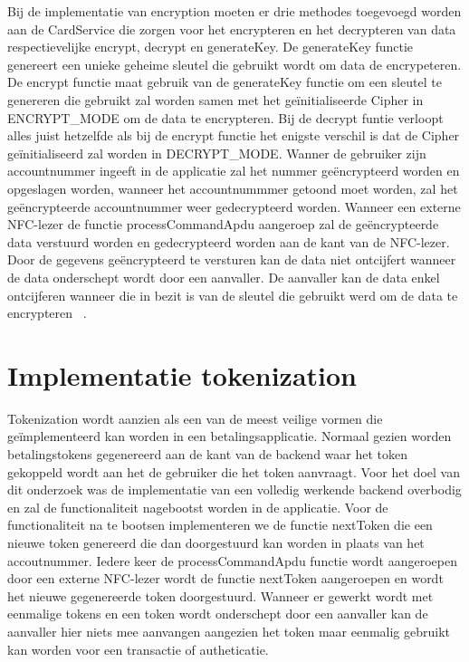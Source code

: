 Bij de implementatie van encryption moeten er drie methodes toegevoegd worden aan de CardService die zorgen voor het encrypteren en het decrypteren van data respectievelijke encrypt, decrypt en generateKey. De generateKey functie genereert een unieke geheime sleutel die gebruikt wordt om data de encrypeteren. De encrypt functie maat gebruik van de generateKey functie om een sleutel te genereren die gebruikt zal worden samen met het geïnitialiseerde Cipher in ENCRYPT\_MODE om de data te encrypteren. Bij de decrypt funtie verloopt alles juist hetzelfde als bij de encrypt functie het enigste verschil is dat de Cipher geïnitialiseerd zal worden in DECRYPT\_MODE. Wanner de gebruiker zijn accountnummer ingeeft in de applicatie zal het nummer geëncrypteerd worden en opgeslagen worden, wanneer het accountnummmer getoond moet worden, zal het geëncrypteerde accountnummer weer gedecrypteerd worden. Wanneer een externe NFC-lezer de functie processCommandApdu aangeroep zal de geëncrypteerde data verstuurd worden en gedecrypteerd worden aan de kant van de NFC-lezer. Door de gegevens geëncrypteerd te versturen kan de data niet ontcijfert wanneer de data onderschept wordt door een aanvaller. De aanvaller kan de data enkel ontcijferen wanneer die in bezit is van de sleutel die gebruikt werd om de data te encrypteren ~\autocite{HowToEncrypt}. 

\section{Implementatie tokenization}

Tokenization wordt aanzien als een van de meest veilige vormen die geïmplementeerd kan worden in een betalingsapplicatie. Normaal gezien worden betalingstokens gegenereerd aan de kant van de backend waar het token gekoppeld wordt aan het de gebruiker die het token aanvraagt. Voor het doel van dit onderzoek was de implementatie van een volledig werkende backend overbodig en zal de functionaliteit nagebootst worden in de applicatie. Voor de functionaliteit na te bootsen implementeren we de functie nextToken die een nieuwe token genereerd die dan doorgestuurd kan worden in plaats van het accoutnummer. Iedere keer de processCommandApdu functie wordt aangeroepen door een externe NFC-lezer wordt de functie nextToken aangeroepen en wordt het nieuwe gegenereerde token doorgestuurd. Wanneer er gewerkt wordt met eenmalige tokens en een token wordt onderschept door een aanvaller kan de aanvaller hier niets mee aanvangen aangezien het token maar eenmalig gebruikt kan worden voor een transactie of autheticatie.

